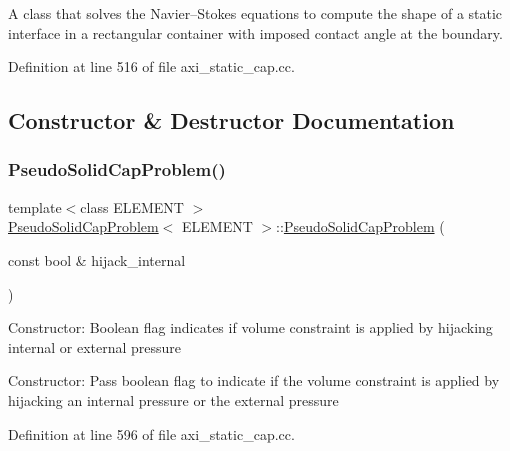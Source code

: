 A class that solves the Navier--Stokes equations to compute the shape of a static interface in a rectangular container with imposed contact angle at the boundary. 

Definition at line 516 of file axi\+\_\+static\+\_\+cap.\+cc.



\subsection{Constructor \& Destructor Documentation}
\mbox{\label{classPseudoSolidCapProblem_a4ac05a07dd55950bb67f7f79cb9fbb77}} 
\subsubsection{\texorpdfstring{Pseudo\+Solid\+Cap\+Problem()}{PseudoSolidCapProblem()}}
{\footnotesize\ttfamily template$<$class E\+L\+E\+M\+E\+NT $>$ \\
\hyperlink{classPseudoSolidCapProblem}{Pseudo\+Solid\+Cap\+Problem}$<$ E\+L\+E\+M\+E\+NT $>$\+::\hyperlink{classPseudoSolidCapProblem}{Pseudo\+Solid\+Cap\+Problem} (\begin{DoxyParamCaption}\item[{const bool \&}]{hijack\+\_\+internal }\end{DoxyParamCaption})}

Constructor\+: Boolean flag indicates if volume constraint is applied by hijacking internal or external pressure

Constructor\+: Pass boolean flag to indicate if the volume constraint is applied by hijacking an internal pressure or the external pressure 

Definition at line 596 of file axi\+\_\+static\+\_\+cap.\+cc.



